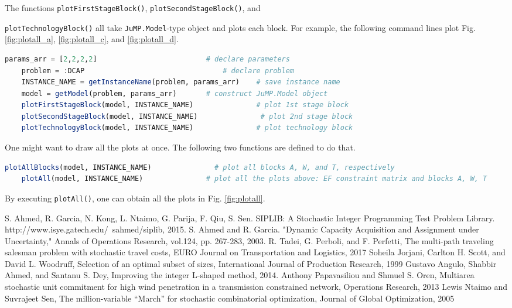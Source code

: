 \documentclass{hitec}
\newcommand{\jumpmodel}{\texttt{JuMP.Model}}
\begin{document}
	The functions \texttt{plotFirstStageBlock()}, \texttt{plotSecondStageBlock()}, and
	 
	 \noindent\texttt{plotTechnologyBlock()} all take \jumpmodel-type object and plots each block. For example, the following command lines plot Fig. \ref{fig:plotall_a}, \ref{fig:plotall_c}, and \ref{fig:plotall_d}.
	\begin{lstlisting}[frame=single,language=julia]
	params_arr = [2,2,2,2]	                        # declare parameters
	problem = :DCAP	                                # declare problem
	INSTANCE_NAME = getInstanceName(problem, params_arr)	# save instance name
	model = getModel(problem, params_arr)	    # construct JuMP.Model object
	plotFirstStageBlock(model, INSTANCE_NAME)               # plot 1st stage block
	plotSecondStageBlock(model, INSTANCE_NAME)               # plot 2nd stage block
	plotTechnologyBlock(model, INSTANCE_NAME)               # plot technology block
	\end{lstlisting}
	
	One might want to draw all the plots at once. The following two functions are defined to do that.
	\begin{lstlisting}[frame=single,language=julia]
	plotAllBlocks(model, INSTANCE_NAME)               # plot all blocks A, W, and T, respectively
	plotAll(model, INSTANCE_NAME)               # plot all the plots above: EF constraint matrix and blocks A, W, T
	\end{lstlisting}
	
	By executing \texttt{plotAll()}, one can obtain all the plots in Fig. \ref{fig:plotall}.
		
	
	
	\begin{thebibliography}{9} 
		S. Ahmed, R. Garcia, N. Kong, L. Ntaimo, G. Parija, F. Qiu, S. Sen. SIPLIB: A Stochastic Integer Programming Test Problem Library. http://www.isye.gatech.edu/~sahmed/siplib, 2015.
		S. Ahmed and R. Garcia. "Dynamic Capacity Acquisition and Assignment under Uncertainty," Annals of Operations Research, vol.124, pp. 267-283, 2003.
		R. Tadei, G. Perboli, and F. Perfetti, The multi-path traveling salesman problem with stochastic travel costs, EURO Journal on Transportation and Logistics, 2017
		Soheila Jorjani, Carlton H. Scott, and David L. Woodruff, Selection of an optimal subset of sizes, International Journal of Production Research, 1999	
		Gustavo Angulo, Shabbir Ahmed, and Santanu S. Dey, Improving the integer L-shaped method, 2014.
		Anthony Papavasiliou and Shmuel S. Oren, Multiarea stochastic unit commitment for high wind penetration in a transmission constrained network, Operations Research, 2013
		Lewis Ntaimo and Suvrajeet Sen, The million-variable ``March'' for stochastic combinatorial optimization, Journal of Global Optimization, 2005
	\end{thebibliography}
	
\end{document}
